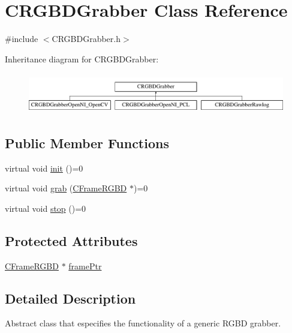 \hypertarget{class_c_r_g_b_d_grabber}{
\section{CRGBDGrabber Class Reference}
\label{class_c_r_g_b_d_grabber}
}


{\ttfamily \#include $<$CRGBDGrabber.h$>$}

Inheritance diagram for CRGBDGrabber:\begin{figure}[H]
\begin{center}
\leavevmode
\includegraphics[height=1.786284cm]{class_c_r_g_b_d_grabber}
\end{center}
\end{figure}
\subsection*{Public Member Functions}
\begin{DoxyCompactItemize}
\item 
virtual void \hyperlink{class_c_r_g_b_d_grabber_ab1aa7a5c871104dd8791d5a3a5117e3a}{init} ()=0
\item 
virtual void \hyperlink{class_c_r_g_b_d_grabber_aa7f9c715a16933287a92ecaf7a1bbfb4}{grab} (\hyperlink{class_c_frame_r_g_b_d}{CFrameRGBD} $\ast$)=0
\item 
virtual void \hyperlink{class_c_r_g_b_d_grabber_a653ef16978adcd9000079f0e5f00addc}{stop} ()=0
\end{DoxyCompactItemize}
\subsection*{Protected Attributes}
\begin{DoxyCompactItemize}
\item 
\hyperlink{class_c_frame_r_g_b_d}{CFrameRGBD} $\ast$ \hyperlink{class_c_r_g_b_d_grabber_a672772dade93a640a52e129f14c6d2fa}{framePtr}
\end{DoxyCompactItemize}


\subsection{Detailed Description}
Abstract class that especifies the functionality of a generic RGBD grabber. 

